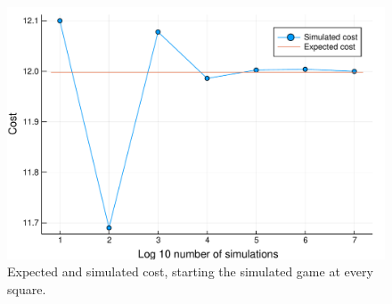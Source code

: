 \begin{figure}
  \begin{center}
    \includegraphics[scale=0.7]{../img/cost_iterations_log.pdf}
  \end{center}
  \caption{Expected and simulated cost, starting the simulated game at every square.}
  \label{fig:cost_square_unif_low}
\end{figure}




